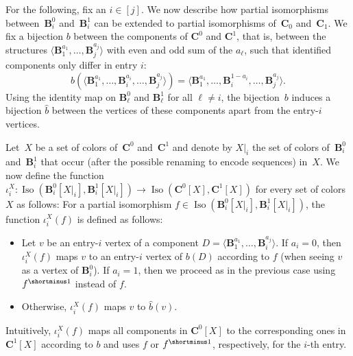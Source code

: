 \documentclass[a4paper,english, thm-restate]{lipics-v2021}
\newcommand{\inv}[1]{#1^{\shortminus 1}}
\newcommand{\StructB}{\mathbf{B}}
\newcommand{\StructC}{\mathbf{C}}
\newcommand{\restrict}[2]{#1|_{#2}}
\newcommand{\isos}[2]{\operatorname*{Iso}(#1,#2)}
\begin{document}
	For the following, fix an $i \in [j]$. We now describe how partial isomorphisms between~$\StructB_i^0$ and~$\StructB_i^1$ can be extended to partial isomorphisms of~$\StructC_0$ and~$\StructC_1$.
	We fix a bijection $b$ between the components of $\StructC^0$ and $\StructC^1$, that is, between the structures $\langle \StructB_1^{a_1}, \dots, \StructB_j^{a_j} \rangle$ with even and odd sum of the $a_\ell$,
	such that identified components only differ in entry $i$:
	\[b(\langle \StructB_1^{a_1}, \dots, \StructB_i^{a_i}, \dots, \StructB_j^{a_j} \rangle ) = \langle \StructB_1^{a_1}, \dots,\StructB_i^{1-a_i}, \dots, \StructB_j^{a_j} \rangle.\]
	Using the identity map on $\StructB_\ell^0$ and $\StructB_\ell^1$ for all $\ell \neq i$,
	the bijection~$b$ induces a bijection $\hat{b}$ between
	the vertices of these components apart from the entry-$i$ vertices.
	
	Let~$X$ be a set of colors of~$\StructC^0$ and~$\StructC^1$
	and denote by $\restrict{X}{i}$ the set of colors of~$\StructB_i^0$ and~$\StructB_i^1$ that occur (after the possible renaming to encode sequences)
	in~$X$.
	We now define the function $\iota_i^X\colon \isos{\StructB_i^0[\restrict{X}{i}]}{\StructB_i^1[\restrict{X}{i}]} \to
	\isos{\StructC^0[X]}{\StructC^1[X]}$ for every set of colors $X$ as follows:
	For a partial isomorphism $f \in \isos{\StructB_i^0[\restrict{X}{i}]}{\StructB_i^1[\restrict{X}{i}]}$,
	the function $\iota_i^X(f)$ is defined as follows:
	\begin{itemize}
		\item Let $v$ be an entry-$i$ vertex of a component $D=\langle \StructB_1^{a_1}, \dots, \StructB_i^{a_j}\rangle$.
		If $a_i = 0$, then $\iota_i^X(f)$ maps $v$ to an entry-$i$ vertex of $b(D)$ according to $f$
		(when seeing $v$ as a vertex of $\StructB_i^0$).
		If $a_i = 1$, then we proceed as in the previous case using $\inv{f}$ instead of $f$.
		\item Otherwise, $\iota_i^X(f)$ maps $v$ to $\hat{b}(v)$.
	\end{itemize}
	Intuitively, $\iota_i^X(f)$ maps all components in $\StructC^0[X]$ to the corresponding ones in $\StructC^1[X]$ according to $b$
	and uses $f$ or $\inv{f}$, respectively, for the $i$-th entry.
	
\end{document}
